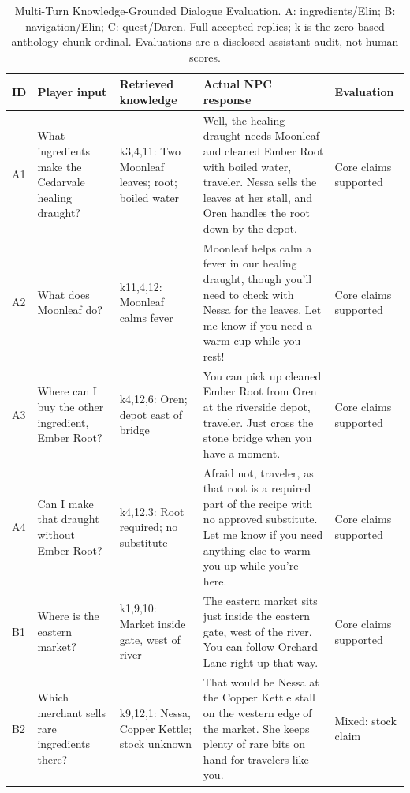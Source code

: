 \begin{table}[t]
\caption{Multi-Turn Knowledge-Grounded Dialogue Evaluation. A: ingredients/Elin; B: navigation/Elin; C: quest/Daren. Full accepted replies; k is the zero-based anthology chunk ordinal. Evaluations are a disclosed assistant audit, not human scores.}
\label{tab:dialogue1}
\centering\small\setlength{\tabcolsep}{3pt}
\renewcommand{\arraystretch}{1.05}
\begin{tabular}{>{\raggedright\arraybackslash}p{}>{\raggedright\arraybackslash}p{}>{\raggedright\arraybackslash}p{}>{\raggedright\arraybackslash}p{}>{\raggedright\arraybackslash}p{}}
\toprule
ID & Player input & Retrieved knowledge & Actual NPC response & Evaluation \\
\midrule
A1 & What ingredients make the Cedarvale healing draught? & k3,4,11: Two Moonleaf leaves; root; boiled water & Well, the healing draught needs Moonleaf and cleaned Ember Root with boiled water, traveler. Nessa sells the leaves at her stall, and Oren handles the root down by the depot. & Core claims supported \\
A2 & What does Moonleaf do? & k11,4,12: Moonleaf calms fever & Moonleaf helps calm a fever in our healing draught, though you'll need to check with Nessa for the leaves. Let me know if you need a warm cup while you rest! & Core claims supported \\
A3 & Where can I buy the other ingredient, Ember Root? & k4,12,6: Oren; depot east of bridge & You can pick up cleaned Ember Root from Oren at the riverside depot, traveler. Just cross the stone bridge when you have a moment. & Core claims supported \\
A4 & Can I make that draught without Ember Root? & k4,12,3: Root required; no substitute & Afraid not, traveler, as that root is a required part of the recipe with no approved substitute. Let me know if you need anything else to warm you up while you're here. & Core claims supported \\
\midrule
B1 & Where is the eastern market? & k1,9,10: Market inside gate, west of river & The eastern market sits just inside the eastern gate, west of the river. You can follow Orchard Lane right up that way. & Core claims supported \\
B2 & Which merchant sells rare ingredients there? & k9,12,1: Nessa, Copper Kettle; stock unknown & That would be Nessa at the Copper Kettle stall on the western edge of the market. She keeps plenty of rare bits on hand for travelers like you. & Mixed: stock claim \\

\end{tabular}
\end{table}
